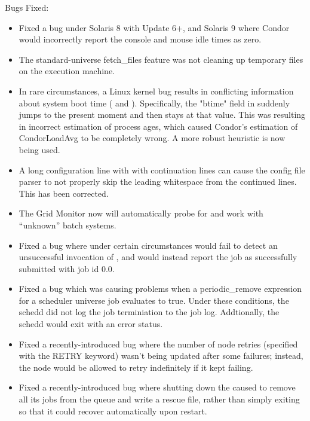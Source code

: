 \noindent Bugs Fixed:

\begin{itemize}

\item Fixed a bug under Solaris 8 with Update 6+, and Solaris 9 where
Condor would incorrectly report the console and mouse idle times as zero.

\item The standard-universe fetch\_files feature was not cleaning up
temporary files on the execution machine.

\item In rare circumstances, a Linux kernel bug results in conflicting
information about system boot time ( and
). 
Specifically, the "btime" field in  suddenly jumps to
the present moment and then stays at that value.  This
was resulting in incorrect estimation of process ages, which caused
Condor's estimation of CondorLoadAvg to be completely wrong.  A more
robust heuristic is now being used.

\item A long configuration line with with continuation lines can cause the
config file parser to not properly skip the leading whitespace from
the continued lines.  This has been corrected.

\item The Grid Monitor now will automatically probe for and work with
``unknown'' batch systems.

\item Fixed a bug where under certain circumstances 
      would fail to detect an unsuccessful invocation of
      , and would instead report the job as
      successfully submitted with job id 0.0.

\item Fixed a bug which was causing problems when a periodic\_remove
expression for a scheduler universe job evaluates to true.  Under
these conditions, the schedd did not log the job terminiation to the
job log.  Addtionally, the schedd would exit with an error status.

\item Fixed a recently-introduced  bug where the number
      of node retries (specified with the RETRY keyword) wasn't being
      updated after some failures; instead, the node would be allowed
      to retry indefinitely if it kept failing.

\item Fixed a recently-introduced bug where shutting down the
       caused  to remove all its jobs
      from the queue and write a rescue file, rather than simply
      exiting so that it could recover automatically upon restart.


\end{itemize}
